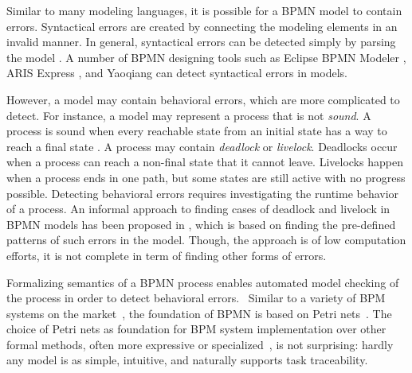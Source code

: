 Similar to many modeling languages, it is possible for a BPMN model to contain errors. Syntactical errors are created by connecting the modeling elements in an invalid manner. %
 In general, syntactical errors can be detected simply by parsing the model \cite{deadlockbpmn}. A number of BPMN designing tools such as Eclipse BPMN Modeler \cite{BPMN2modeler}, ARIS Express \cite{arisexpress}, and Yaoqiang \cite{Yaoqiang} can detect syntactical errors in models. 

However, a model may contain behavioral errors, which are more complicated to detect. For instance, a model may represent a process that is not \emph{sound}. A process is sound when every reachable state from an initial state has a way to reach a final state \cite{RPU+07}. A process may contain \emph{deadlock} or \emph{livelock}. Deadlocks occur when a process can reach a non-final state that it cannot leave. Livelocks happen when a process ends in one path, but some states are still active with no progress possible. Detecting behavioral errors requires investigating the runtime behavior of a process. An informal approach to finding cases of deadlock and livelock in BPMN models has been proposed in \cite{deadlockbpmn} \cite{livelock2gholoo}, which is based on finding the pre-defined patterns of such errors in the model. Though, the approach is of low computation efforts, it is not complete in term of finding other forms of errors. 

Formalizing semantics of a BPMN process enables automated model checking of the process in order to  detect behavioral errors. 
\ 
Similar to a variety of BPM systems on the market~\cite{Dumas:2013:FBP:2462579}, the foundation of BPMN is based on  Petri nets~\cite{vanderAalst2004}. The choice of Petri nets as foundation for BPM system implementation over other formal methods, often more expressive or   specialized~\cite{Bruni:2005:TFC:1040305.1040323,Butler:2004:TSL:2178738.2178750}, is not surprising: hardly any model is as simple, intuitive, and naturally supports task traceability.

